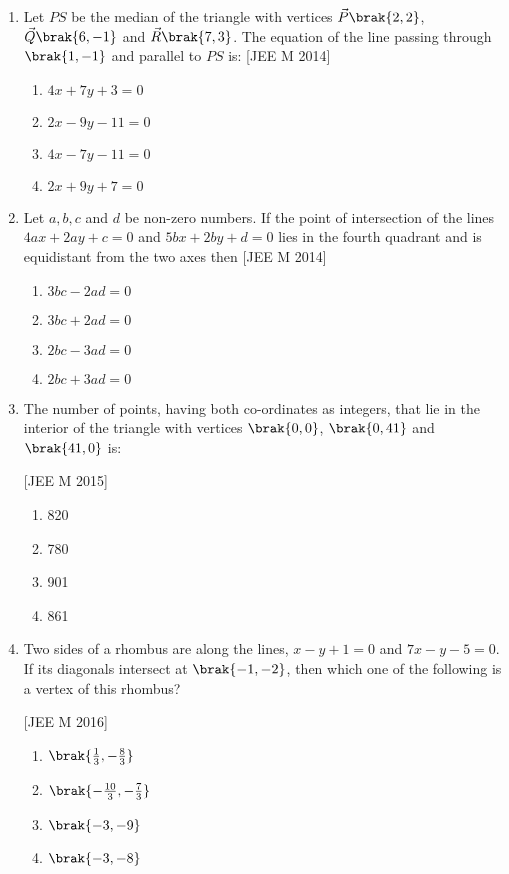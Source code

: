\begin{enumerate}
\item Let $PS$ be the median of the triangle with vertices $\vec{P}\brak{2, 2}$, $\vec{Q}\brak{6, -1}$ and $\vec{R}\brak{7,3}$. The equation of the line passing through $\brak{1, -1}$ and parallel to $PS$ is: \hfill{[JEE M 2014]}
\begin{multicols}{2}
\begin{enumerate}
\item $4x+7y+3=0$
\item $2x-9y-11=0$
\item $4x-7y-11=0$
\item $2x+9y+7=0$
\end{enumerate}
\end{multicols}

\item Let $a, b, c$ and $d$ be non-zero numbers. If the point of intersection of the lines $4ax+2ay+c=0$ and $5bx+2by+d=0$ lies in the fourth quadrant and is equidistant from the two axes then \hfill{[JEE M 2014]}
\begin{multicols}{2}
\begin{enumerate}
\item $3bc-2ad= 0$
\item $3bc+2ad=0$
\item $2bc-3ad= 0$
\item $2bc+3ad=0$ 
\end{enumerate}
\end{multicols}

\item The number of points, having both co-ordinates as integers, 
that lie in the interior of the triangle with vertices $\brak{0, 0}$,  $\brak{0,41}$ and $\brak{41, 0}$ is: 

\hfill{[JEE M 2015]}
\begin{multicols}{4}
\begin{enumerate}
\item 820
\item 780
\item 901
\item 861
\end{enumerate}
\end{multicols}

\item Two sides of a rhombus are along the lines, $x-y+1=0$ and 
$7x-y-5=0$. If its diagonals intersect at $\brak{-1, -2}$, then which one of the following is a vertex of this rhombus?

\hfill{[JEE M 2016]}
\begin{multicols}{2}
\begin{enumerate}
\item $\brak{\frac{1}{3}, -\frac{8}{3}}$
\item $\brak{-\frac{10}{3}, -\frac{7}{3}}$
\item $\brak{-3, -9}$
\item $\brak{-3, -8}$
\end{enumerate}
\end{multicols}


\end{enumerate}
